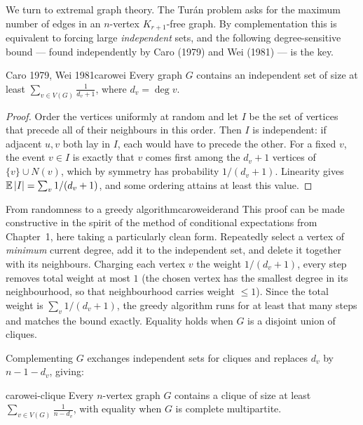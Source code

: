 We turn to extremal graph theory. The Tur\'an problem asks for the maximum
number of edges in an $n$-vertex $K_{r+1}$-free graph. By complementation this
is equivalent to forcing large \emph{independent} sets, and the following
degree-sensitive bound --- found independently by Caro (1979) and Wei (1981)
--- is the key.

\begin{theorem}{Caro 1979, Wei 1981}{carowei}
Every graph $G$ contains an independent set of size at least
$\displaystyle\sum_{v\in V(G)}\frac{1}{d_v+1}$, where $d_v=\deg v$.
\end{theorem}

\begin{proof}
Order the vertices uniformly at random and let $I$ be the set of vertices that
precede all of their neighbours in this order. Then $I$ is independent: if
adjacent $u,v$ both lay in $I$, each would have to precede the other. For a
fixed $v$, the event $v\in I$ is exactly that $v$ comes first among the
$d_v+1$ vertices of $\{v\}\cup N(v)$, which by symmetry has probability
$1/(d_v+1)$. Linearity gives $\mathbb{E}\,|I|=\sum_v 1/(d_v+1)$, and some ordering
attains at least this value.
\end{proof}

\begin{remark}{From randomness to a greedy algorithm}{caroweiderand}
This proof can be made constructive in the spirit of the method of
conditional expectations from Chapter~1, here taking a particularly clean
form. Repeatedly select a vertex of \emph{minimum} current degree, add it to
the independent set, and delete it together with its neighbours. Charging each
vertex $v$ the weight $1/(d_v+1)$, every step removes total weight at most
$1$ (the chosen vertex has the smallest degree in its neighbourhood, so that
neighbourhood carries weight $\le 1$). Since the total weight is
$\sum_v 1/(d_v+1)$, the greedy algorithm runs for at least that many steps and
matches the bound exactly. Equality holds when $G$ is a disjoint union of
cliques.
\end{remark}

Complementing $G$ exchanges independent sets for cliques and replaces $d_v$ by
$n-1-d_v$, giving:

\begin{corollary}{}{carowei-clique}
Every $n$-vertex graph $G$ contains a clique of size at least
$\displaystyle\sum_{v\in V(G)}\frac{1}{n-d_v}$, with equality when $G$ is
complete multipartite.
\end{corollary}

